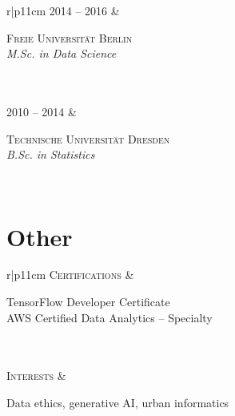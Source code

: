 \documentclass[11pt,a4paper]{article}
\begin{document}
\begin{flushright}
\begin{tabular}{r|p{11cm}}
\textsc{2014 -- 2016} & \begin{minipage}[t]{\linewidth} \textsc{Freie Universität Berlin}\\
\emph{M.Sc. in Data Science} \end{minipage} \\
 \\
\textsc{2010 -- 2014} & \begin{minipage}[t]{\linewidth} \textsc{Technische Universität Dresden}\\
\emph{B.Sc. in Statistics} \end{minipage} \\
\end{tabular}
\end{flushright}

\section*{Other}\label{other}

\begin{flushright}
\begin{tabular}{r|p{11cm}}
\textsc{Certifications} & \begin{minipage}[t]{\linewidth} TensorFlow Developer Certificate\\
AWS Certified Data Analytics -- Specialty \end{minipage} \\
 \\
\textsc{Interests} & \begin{minipage}[t]{\linewidth} Data ethics, generative AI, urban informatics \end{minipage} \\
\end{tabular}
\end{flushright}
\end{document}
